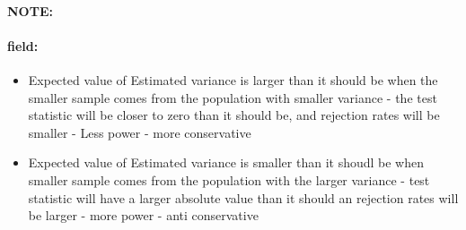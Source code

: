 \documentclass[12pt]{article}
\newenvironment{note}{\paragraph{NOTE:}}{}
\newenvironment{field}{\paragraph{field:}}{}
\begin{document}
\begin{note}
\begin{field}
\begin{itemize}
\begin{itemize}
          \item Expected value of Estimated variance is larger than it should be when the smaller sample comes from the population with smaller variance - the test statistic will be closer to zero than it should be, and rejection rates will be smaller - Less power - more conservative
          \item Expected value of Estimated variance is smaller than it shoudl be when smaller sample comes from the population with the larger variance - test statistic will have a larger absolute value than it should an rejection rates will be larger  - more power - anti conservative
         \end{itemize}
  \end{itemize}
 \end{field}
\end{note}
\end{document}
